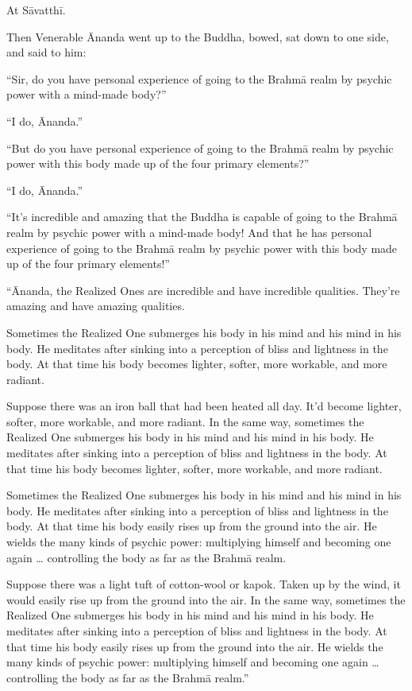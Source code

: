\documentclass[12pt,openany]{book}%
\begin{document}
At \textsanskrit{Sāvatthī}. 

Then Venerable Ānanda went up to the Buddha, bowed, sat down to one side, and said to him: 

“Sir, do you have personal experience of going to the \textsanskrit{Brahmā} realm by psychic power with a mind-made body?” 

“I do, Ānanda.” 

“But do you have personal experience of going to the \textsanskrit{Brahmā} realm by psychic power with this body made up of the four primary elements?” 

“I do, Ānanda.” 

“It’s incredible and amazing that the Buddha is capable of going to the \textsanskrit{Brahmā} realm by psychic power with a mind-made body! And that he has personal experience of going to the \textsanskrit{Brahmā} realm by psychic power with this body made up of the four primary elements!” 

“Ānanda, the Realized Ones are incredible and have incredible qualities. They’re amazing and have amazing qualities. 

Sometimes the Realized One submerges his body in his mind and his mind in his body. He meditates after sinking into a perception of bliss and lightness in the body. At that time his body becomes lighter, softer, more workable, and more radiant. 

Suppose there was an iron ball that had been heated all day. It’d become lighter, softer, more workable, and more radiant. In the same way, sometimes the Realized One submerges his body in his mind and his mind in his body. He meditates after sinking into a perception of bliss and lightness in the body. At that time his body becomes lighter, softer, more workable, and more radiant. 

Sometimes the Realized One submerges his body in his mind and his mind in his body. He meditates after sinking into a perception of bliss and lightness in the body. At that time his body easily rises up from the ground into the air. He wields the many kinds of psychic power: multiplying himself and becoming one again … controlling the body as far as the \textsanskrit{Brahmā} realm. 

Suppose there was a light tuft of cotton-wool or kapok. Taken up by the wind, it would easily rise up from the ground into the air. In the same way, sometimes the Realized One submerges his body in his mind and his mind in his body. He meditates after sinking into a perception of bliss and lightness in the body. At that time his body easily rises up from the ground into the air. He wields the many kinds of psychic power: multiplying himself and becoming one again … controlling the body as far as the \textsanskrit{Brahmā} realm.” 
\end{document}
